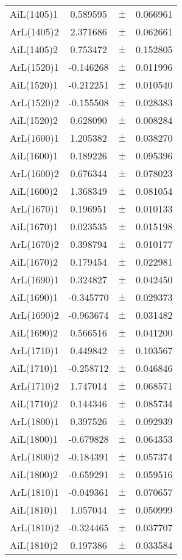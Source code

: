 \begin{table}
\begin{tiny}
\begin{tabular}{lccc}
AiL(1405)1 & 0.589595 & $\pm$ & 0.066961 \\
ArL(1405)2 & 2.371686 & $\pm$ & 0.062661 \\
AiL(1405)2 & 0.753472 & $\pm$ & 0.152805 \\
ArL(1520)1 & -0.146268 & $\pm$ & 0.011996 \\
AiL(1520)1 & -0.212251 & $\pm$ & 0.010540 \\
ArL(1520)2 & -0.155508 & $\pm$ & 0.028383 \\
AiL(1520)2 & 0.628090 & $\pm$ & 0.008284 \\
ArL(1600)1 & 1.205382 & $\pm$ & 0.038270 \\
AiL(1600)1 & 0.189226 & $\pm$ & 0.095396 \\
ArL(1600)2 & 0.676344 & $\pm$ & 0.078023 \\
AiL(1600)2 & 1.368349 & $\pm$ & 0.081054 \\
ArL(1670)1 & 0.196951 & $\pm$ & 0.010133 \\
AiL(1670)1 & 0.023535 & $\pm$ & 0.015198 \\
ArL(1670)2 & 0.398794 & $\pm$ & 0.010177 \\
AiL(1670)2 & 0.179454 & $\pm$ & 0.022981 \\
ArL(1690)1 & 0.324827 & $\pm$ & 0.042450 \\
AiL(1690)1 & -0.345770 & $\pm$ & 0.029373 \\
ArL(1690)2 & -0.963674 & $\pm$ & 0.031482 \\
AiL(1690)2 & 0.566516 & $\pm$ & 0.041200 \\
ArL(1710)1 & 0.449842 & $\pm$ & 0.103567 \\
AiL(1710)1 & -0.258712 & $\pm$ & 0.046846 \\
ArL(1710)2 & 1.747014 & $\pm$ & 0.068571 \\
AiL(1710)2 & 0.144346 & $\pm$ & 0.085734 \\
ArL(1800)1 & 0.397526 & $\pm$ & 0.092939 \\
AiL(1800)1 & -0.679828 & $\pm$ & 0.064353 \\
ArL(1800)2 & -0.184391 & $\pm$ & 0.057374 \\
AiL(1800)2 & -0.659291 & $\pm$ & 0.059516 \\
ArL(1810)1 & -0.049361 & $\pm$ & 0.070657 \\
AiL(1810)1 & 1.057044 & $\pm$ & 0.050999 \\
ArL(1810)2 & -0.324465 & $\pm$ & 0.037707 \\
AiL(1810)2 & 0.197386 & $\pm$ & 0.033584 \\

\end{tabular}
\end{tiny}
\end{table}
